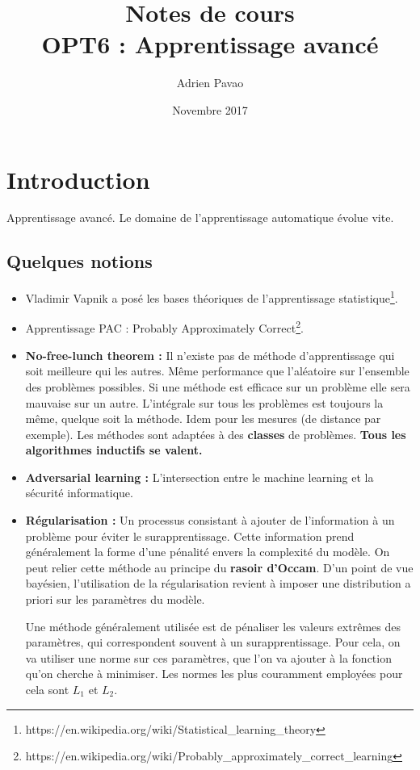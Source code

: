 \documentclass{article}
\title{Notes de cours\\OPT6 : Apprentissage avancé}
\author{Adrien Pavao}
\date{Novembre 2017}
\begin{document}
\maketitle


\section{Introduction}

Apprentissage avancé. Le domaine de l'apprentissage automatique évolue vite.

\subsection{Quelques notions}
\begin{itemize}
\item Vladimir Vapnik a posé les bases théoriques de l'apprentissage statistique\footnote{https://en.wikipedia.org/wiki/Statistical\_learning\_theory}.
\item Apprentissage PAC : Probably Approximately Correct\footnote{https://en.wikipedia.org/wiki/Probably\_approximately\_correct\_learning}.
\item \textbf{No-free-lunch theorem :} Il n'existe pas de méthode d'apprentissage qui soit meilleure qui les autres. Même performance que l'aléatoire sur l'ensemble des problèmes possibles. Si une méthode est efficace sur un problème elle sera mauvaise sur un autre. L'intégrale sur tous les problèmes est toujours la même, quelque soit la méthode. Idem pour les mesures (de distance par exemple). Les méthodes sont adaptées à des \textbf{classes} de problèmes. \textbf{Tous les algorithmes inductifs se valent.}
\item \textbf{Adversarial learning :} L'intersection entre le machine learning et la sécurité informatique.
\item \textbf{Régularisation :} Un processus consistant à ajouter de l'information à un problème pour éviter le surapprentissage. Cette information prend généralement la forme d'une pénalité envers la complexité du modèle. On peut relier cette méthode au principe du \textbf{rasoir d'Occam}. D'un point de vue bayésien, l'utilisation de la régularisation revient à imposer une distribution a priori sur les paramètres du modèle.

Une méthode généralement utilisée est de pénaliser les valeurs extrêmes des paramètres, qui correspondent souvent à un surapprentissage. Pour cela, on va utiliser une norme sur ces paramètres, que l'on va ajouter à la fonction qu'on cherche à minimiser. Les normes les plus couramment employées pour cela sont $L_1$ et $L_2$.


\end{itemize}
\end{document}
